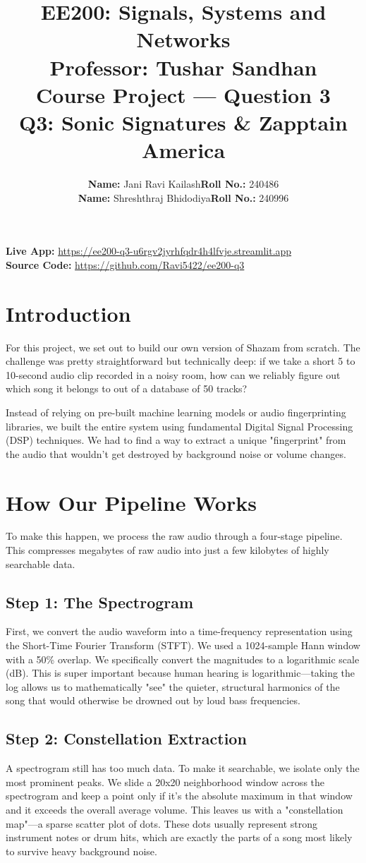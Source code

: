 \documentclass[11pt, a4paper]{article}
\title{
    \vspace{2cm}
    \textbf{EE200: Signals, Systems and Networks} \\
    \vspace{0.5cm}
    \large Professor: Tushar Sandhan \\
    Course Project — Question 3 \\
    \vspace{1cm}
    \textbf{\Large Q3: Sonic Signatures \& Zapptain America}
    \vspace{2cm}
}
\author{
    \begin{tabular}{lr}
        \textbf{Name:} Jani Ravi Kailash & \textbf{Roll No.:} 240486 \\
        \textbf{Name:} Shreshthraj Bhidodiya & \textbf{Roll No.:} 240996
    \end{tabular}
}
\date{}
\begin{document}
\maketitle

\begin{center}
    \textbf{Live App:} \url{https://ee200-q3-u6rgv2jyrhfqdr4h4lfvje.streamlit.app} \\
    \textbf{Source Code:} \url{https://github.com/Ravi5422/ee200-q3}
\end{center}

\newpage

\section{Introduction}
For this project, we set out to build our own version of Shazam from scratch. The challenge was pretty straightforward but technically deep: if we take a short 5 to 10-second audio clip recorded in a noisy room, how can we reliably figure out which song it belongs to out of a database of 50 tracks?

Instead of relying on pre-built machine learning models or audio fingerprinting libraries, we built the entire system using fundamental Digital Signal Processing (DSP) techniques. We had to find a way to extract a unique "fingerprint" from the audio that wouldn't get destroyed by background noise or volume changes.

\section{How Our Pipeline Works}
To make this happen, we process the raw audio through a four-stage pipeline. This compresses megabytes of raw audio into just a few kilobytes of highly searchable data.

\subsection{Step 1: The Spectrogram}
First, we convert the audio waveform into a time-frequency representation using the Short-Time Fourier Transform (STFT). We used a 1024-sample Hann window with a 50\% overlap. 
We specifically convert the magnitudes to a logarithmic scale (dB). This is super important because human hearing is logarithmic—taking the log allows us to mathematically "see" the quieter, structural harmonics of the song that would otherwise be drowned out by loud bass frequencies.

\subsection{Step 2: Constellation Extraction}
A spectrogram still has too much data. To make it searchable, we isolate only the most prominent peaks. We slide a 20x20 neighborhood window across the spectrogram and keep a point only if it's the absolute maximum in that window and it exceeds the overall average volume. 
This leaves us with a "constellation map"—a sparse scatter plot of dots. These dots usually represent strong instrument notes or drum hits, which are exactly the parts of a song most likely to survive heavy background noise.
\end{document}
